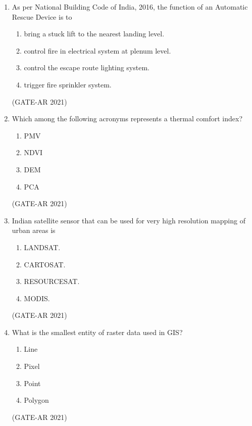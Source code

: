 \documentclass[a4paper,10pt]{article}
\begin{document}
\begin{enumerate}
    \item As per National Building Code of India, 2016, the function of an Automatic Rescue Device is to 
    \begin{enumerate}
        \item bring a stuck lift to the nearest landing level.
        \item control fire in electrical system at plenum level.
        \item control the escape route lighting system.
        \item trigger fire sprinkler system.
    \end{enumerate}
    \hfill (GATE-AR 2021)

    \item Which among the following acronyms represents a thermal comfort index? 
    \begin{multicols}{4}
    \begin{enumerate}
        \item PMV
        \item NDVI
        \item DEM
        \item PCA
    \end{enumerate}
    \end{multicols}
    \hfill (GATE-AR 2021)

    \item Indian satellite sensor that can be used for very high resolution mapping of urban areas is 
    \begin{multicols}{2}
    \begin{enumerate}
        \item LANDSAT.
        \item CARTOSAT.
        \item RESOURCESAT.
        \item MODIS.
    \end{enumerate}
    \end{multicols}
    \hfill (GATE-AR 2021)

    \item What is the smallest entity of raster data used in GIS? 
    \begin{multicols}{4}
    \begin{enumerate}
        \item Line
        \item Pixel
        \item Point
        \item Polygon
    \end{enumerate}
    \end{multicols}
    \hfill (GATE-AR 2021)


\end{enumerate}
\end{document}
